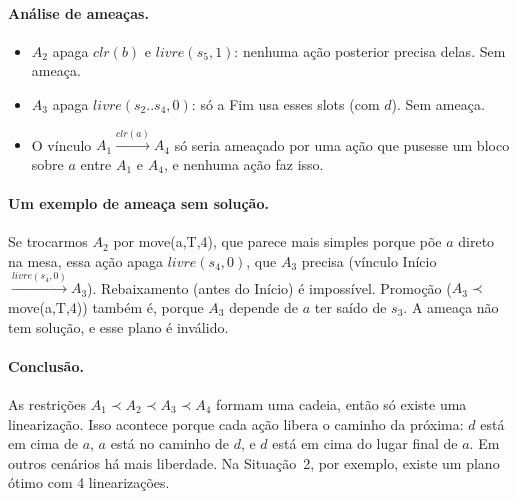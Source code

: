 \documentclass[11pt,a4paper]{article}
\newcommand{\clr}{\mathit{clr}}
\newcommand{\livre}{\mathit{livre}}
\begin{document}
\pagebreak[3]
\paragraph{Análise de ameaças.}
\begin{itemize}
  \item $A_2$ apaga $\clr(b)$ e $\livre(s_5,1)$: nenhuma ação posterior precisa
        delas. Sem ameaça.
  \item $A_3$ apaga $\livre(s_2..s_4,0)$: só a Fim usa esses slots (com $d$).
        Sem ameaça.
  \item O vínculo $A_1\xrightarrow{\clr(a)}A_4$ só seria ameaçado por uma ação que
        pusesse um bloco sobre $a$ entre $A_1$ e $A_4$, e nenhuma ação faz isso.
\end{itemize}

\paragraph{Um exemplo de ameaça sem solução.} Se trocarmos $A_2$ por
move(a,T,4), que parece mais simples porque põe $a$ direto na mesa, essa ação apaga
$\livre(s_4,0)$, que $A_3$ precisa (vínculo Início $\xrightarrow{\livre(s_4,0)} A_3$).
Rebaixamento (antes do Início) é impossível. Promoção ($A_3\prec$ move(a,T,4))
também é, porque $A_3$ depende de $a$ ter saído de $s_3$. A ameaça não tem
solução, e esse plano é inválido.

\paragraph{Conclusão.} As restrições $A_1\prec A_2\prec A_3\prec A_4$ formam uma
cadeia, então só existe uma linearização. Isso acontece porque cada ação libera o
caminho da próxima: $d$ está em cima de $a$, $a$ está no caminho de $d$, e $d$ está
em cima do lugar final de $a$. Em outros cenários há mais liberdade. Na Situação~2,
por exemplo, existe um plano ótimo com 4 linearizações.
\end{document}
